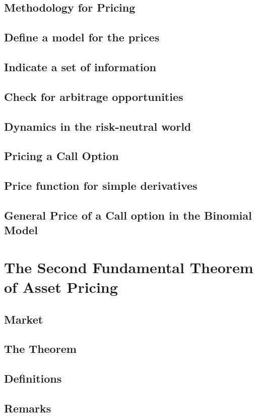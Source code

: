 \documentclass{beamer}
\numberwithin{equation}{section}
\begin{document}
\subsection{Methodology for Pricing}
\subsection{Define a model for the prices}
\subsection{Indicate a set of information}
\subsection{Check for arbitrage opportunities}
\subsection{Dynamics in the risk-neutral world}
\subsection{Pricing a Call Option}
\subsection{Price function for simple derivatives}
\subsection{General Price of a Call option in the Binomial Model}

\section{The Second Fundamental Theorem of Asset Pricing}
\subsection{Market}
\subsection{The Theorem}
\subsection{Definitions}
\subsection{Remarks}
\end{document}
